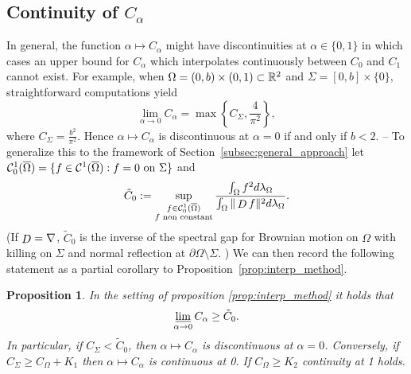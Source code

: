 \documentclass[a4paper]{article}
\newtheorem{proposition}[theorem]{Proposition}
\theoremstyle{definition}
\numberwithin{equation}{section}
\begin{document}
\subsection{Continuity of \texorpdfstring{$C_\alpha$}{C alpha}}
\label{subsection:cont_section} 
In general, the  function $\alpha\mapsto C_\alpha$ 
might have discontinuities at  $\alpha\in \{0,1\}$ in which cases an upper bound for $C_\alpha$ which interpolates continuously between $C_0$ and $C_1$ cannot exist. For example, when $\Omega=(0,b) \times (0,1)\subset \mathbb{R}^2$ and $\Sigma=[0,b]\times\{0\}$, straightforward  computations yield \[
  \lim_{ \alpha \to  0 }C_{\alpha}= \max\left\{ C_\Sigma, \frac{4}{ \pi^2 } \right\},
\] 
where $C_\Sigma= \frac{b^2}{\pi^2}$. Hence $\alpha \mapsto C_{\alpha}$  is discontinuous at $\alpha=0$   if and only if $b< 2$.  
-- To generalize this to the framework of Section~\ref{subsec:general_approach}  let 
   $\mathcal{C}^1_0(\overline{\Omega})=\{f \in \mathcal{C}^1(\overline{\Omega}) : f=0 \mbox{ on }\Sigma\}$  
and 
  \[
    \tilde{C}_0:=\sup_{\substack {f \in \mathcal{C}^1_0(\overline \Omega) \\ f \text{ non constant}}}  \frac{\int_\Omega f^2d\lambda_\Omega}{\int_\Omega \| \mathop D f\|^2d\lambda_\Omega}.
  \]
  (If $\mathop D = \nabla$, $\tilde C_0$ is the inverse of the spectral gap for Brownian motion on $\Omega$ with killing on $\Sigma$ and normal reflection at $\partial \Omega \setminus \Sigma$. )
We can then record the following statement as a partial corollary to Proposition~\ref{prop:interp_method}.

\begin{proposition} 
\label{prop:continuity_condition}
In the setting of proposition \ref{prop:interp_method} it holds that  \[
    \varliminf_{ \alpha \to 0 }C_{\alpha}\geq \tilde{C}_0.
  \]
In particular,  if $C_\Sigma < \tilde C_0$, then $\alpha \mapsto C_\alpha$ is discontinuous at $\alpha=0$. Conversely, if $C_\Sigma \geq C_\Omega+K_1$ then $\alpha \mapsto C_\alpha$ is continuous at 0. If $C_{\Omega} \geq K_2$ continuity at 1 holds.
\end{proposition}
\end{document}

